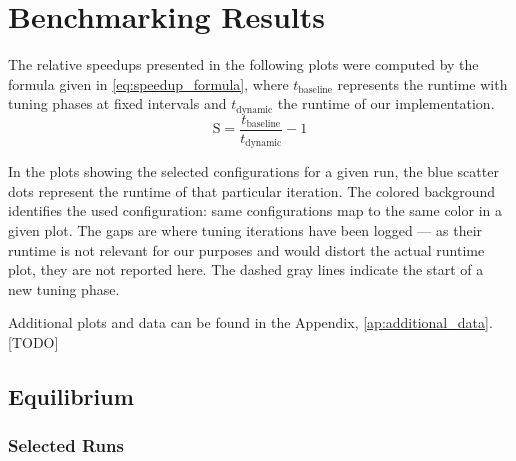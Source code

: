 




\section{Benchmarking Results}
\label{sec:benchmarking_results}

The relative speedups presented in the following plots were computed by the formula given in \eqref{eq:speedup_formula}, where $t_\text{baseline}$ represents the runtime with tuning phases at fixed intervals and $t_\text{dynamic}$ the runtime of our implementation.
\begin{equation}
	\text{S}=\frac{t_\text{baseline}}{t_\text{dynamic}}-1\label{eq:speedup_formula}
\end{equation}

In the plots showing the selected configurations for a given run, the blue scatter dots represent the runtime of that particular iteration. The colored background identifies the used configuration: same configurations map to the same color in a given plot. The gaps are where tuning iterations have been logged --- as their runtime is not relevant for our purposes and would distort the actual runtime plot, they are not reported here. The dashed gray lines indicate the start of a new tuning phase.

Additional plots and data can be found in the Appendix, \autoref{ap:additional_data}. [TODO]

\newpage
\subsection{Equilibrium}
\subsubsection{Selected Runs}

